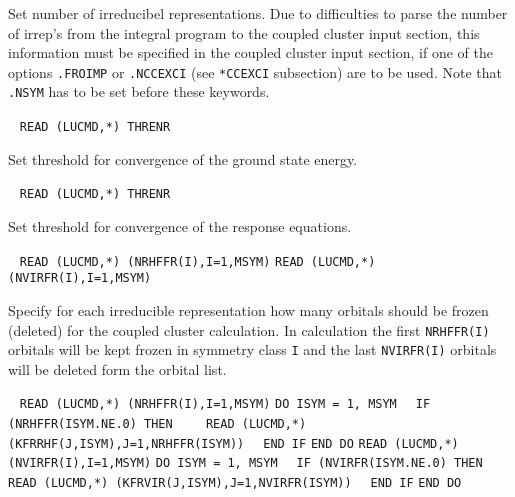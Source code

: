 \begin{description}
       Set number of irreducibel representations. 
       Due to difficulties to parse the number of irrep's from
       the integral program to the coupled cluster input section,
       this information must be specified in the coupled cluster
       input section, if one of the options \verb+.FROIMP+ or
       \verb+.NCCEXCI+ (see \verb+*CCEXCI+ subsection) are to be used.
       Note that \verb+.NSYM+ has to be set before these keywords.
 
\item[\Key{THRENR}] \verb| |\newline
       \verb|READ (LUCMD,*) THRENR|

       Set threshold for convergence of the ground state energy.
 
\item[\Key{THRLEQ}] \verb| |\newline
       \verb|READ (LUCMD,*) THRENR|

       Set threshold for convergence of the response equations.
 
\item[\Key{FROIMP}] \verb| |\newline
      \verb|READ (LUCMD,*) (NRHFFR(I),I=1,MSYM)|\newline
      \verb|READ (LUCMD,*) (NVIRFR(I),I=1,MSYM)|

      Specify for each irreducible representation how
      many orbitals should be frozen (deleted) for the coupled
      cluster calculation. In calculation the first \verb+NRHFFR(I)+
      orbitals will be kept frozen in symmetry class \verb+I+ and
      the last \verb+NVIRFR(I)+ orbitals will be deleted form the 
      orbital list.
 
\item[\Key{FROEXP}]  \verb| |\newline
    \verb|READ (LUCMD,*) (NRHFFR(I),I=1,MSYM)|\newline
    \verb|DO ISYM = 1, MSYM|\newline
    \verb|  IF (NRHFFR(ISYM.NE.0) THEN|\newline
    \verb|    READ (LUCMD,*) (KFRRHF(J,ISYM),J=1,NRHFFR(ISYM))|\newline
    \verb|  END IF|\newline
    \verb|END DO|\newline
    \verb|READ (LUCMD,*) (NVIRFR(I),I=1,MSYM)|\newline
    \verb|DO ISYM = 1, MSYM|\newline
    \verb|  IF (NVIRFR(ISYM.NE.0) THEN|\newline
    \verb|    READ (LUCMD,*) (KFRVIR(J,ISYM),J=1,NVIRFR(ISYM))|\newline
    \verb|  END IF|\newline
    \verb|END DO|


\end{description}
